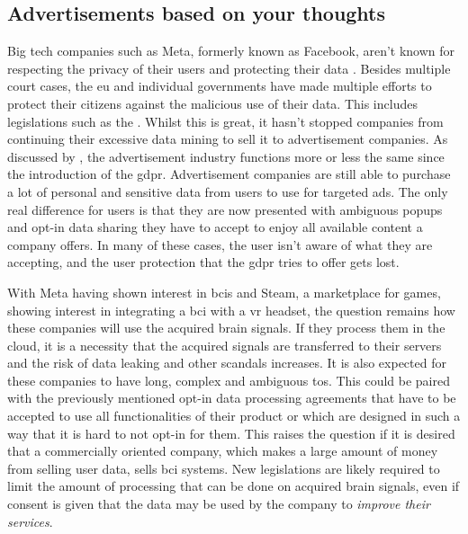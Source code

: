 
\subsection{Advertisements based on your thoughts}
\label{subsec:bci_ethical_data_mining}

Big tech companies such as Meta, formerly known as Facebook, aren't known for respecting the privacy of their users and protecting their data \citep{facebook_drama1, facebook_drama2}.
Besides multiple court cases, the \gls{eu} and individual governments have made multiple efforts to protect their citizens against the malicious use of their data.
This includes legislations such as the .
Whilst this is great, it hasn't stopped companies from continuing their excessive data mining to sell it to advertisement companies.
As discussed by \citet{gdpr_adds}, the advertisement industry functions more or less the same since the introduction of the \gls{gdpr}.
Advertisement companies are still able to purchase a lot of personal and sensitive data from users to use for targeted ads.
The only real difference for users is that they are now presented with ambiguous popups and opt-in data sharing they have to accept to enjoy all available content a company offers.
In many of these cases, the user isn't aware of what they are accepting, and the user protection that the \gls{gdpr} tries to offer gets lost.

With Meta having shown interest in \glspl{bci} and Steam, a marketplace for games, showing interest in integrating a \gls{bci} with a \gls{vr} headset, the question remains how these companies will use the acquired brain signals.
If they process them in the cloud, it is a necessity that the acquired signals are transferred to their servers and the risk of data leaking and other scandals increases.
It is also expected for these companies to have long, complex and ambiguous \gls{tos}.
This could be paired with the previously mentioned opt-in data processing agreements that have to be accepted to use all functionalities of their product or which are designed in such a way that it is hard to not opt-in for them.
This raises the question if it is desired that a commercially oriented company, which makes a large amount of money from selling user data, sells \gls{bci} systems.
New legislations are likely required to limit the amount of processing that can be done on acquired brain signals, even if consent is given that the data may be used by the company to \textit{improve their services}.


